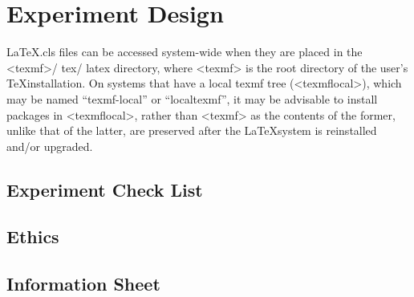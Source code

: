 		\chapter{Experiment Design} \label{appendix:c}

\LaTeX .cls  files can be accessed system-wide when they are placed in the
<texmf>/ tex/ latex directory, where <texmf> is the root directory of the user’s
\TeX installation.
On systems that have a local texmf tree (<texmflocal>), which
may be named ``texmf-local'' or ``localtexmf'', it may be advisable to install
packages in <texmflocal>, rather than <texmf> as the contents of the former,
unlike that of the latter, are preserved after the \LaTeX system is reinstalled
and/or upgraded.



\section{Experiment Check List} \label{appendix:c:ecl}
\section{Ethics} \label{appendix:d:e}
\section{Information Sheet} \label{appendix:d:is}

